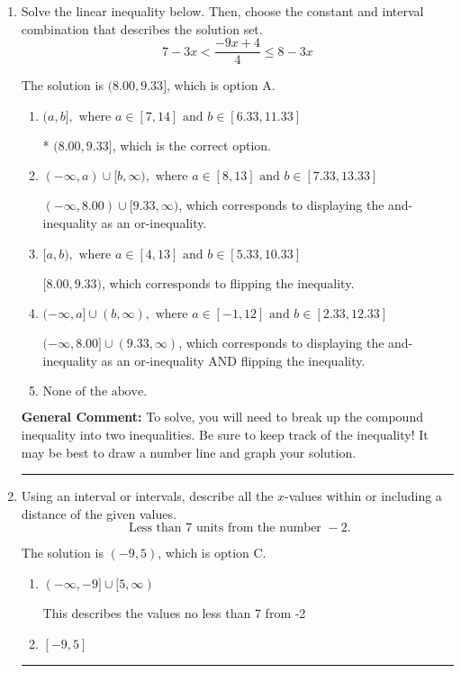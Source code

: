 \documentclass{extbook}[14pt]
\newcommand{\litem}[1]{\item #1

\rule{\textwidth}{0.4pt}}
\begin{document}
\begin{enumerate}
{\begin{enumerate}[label=\Alph*.]
Corresponds to the variable canceling, which does not happen in this instance.
\end{enumerate}

\textbf{General Comment:} When multiplying or dividing by a negative, flip the sign.
}
\litem{
Solve the linear inequality below. Then, choose the constant and interval combination that describes the solution set.
\[ 7 - 3 x < \frac{-9 x + 4}{4} \leq 8 - 3 x \]

The solution is \( (8.00, 9.33] \), which is option A.\begin{enumerate}[label=\Alph*.]
\item \( (a, b], \text{ where } a \in [7, 14] \text{ and } b \in [6.33, 11.33] \)

* $(8.00, 9.33]$, which is the correct option.
\item \( (-\infty, a) \cup [b, \infty), \text{ where } a \in [8, 13] \text{ and } b \in [7.33, 13.33] \)

$(-\infty, 8.00) \cup [9.33, \infty)$, which corresponds to displaying the and-inequality as an or-inequality.
\item \( [a, b), \text{ where } a \in [4, 13] \text{ and } b \in [5.33, 10.33] \)

$[8.00, 9.33)$, which corresponds to flipping the inequality.
\item \( (-\infty, a] \cup (b, \infty), \text{ where } a \in [-1, 12] \text{ and } b \in [2.33, 12.33] \)

$(-\infty, 8.00] \cup (9.33, \infty)$, which corresponds to displaying the and-inequality as an or-inequality AND flipping the inequality.
\item \( \text{None of the above.} \)


\end{enumerate}

\textbf{General Comment:} To solve, you will need to break up the compound inequality into two inequalities. Be sure to keep track of the inequality! It may be best to draw a number line and graph your solution.
}
\litem{
Using an interval or intervals, describe all the $x$-values within or including a distance of the given values.
\[ \text{ Less than } 7 \text{ units from the number } -2. \]

The solution is \( (-9, 5) \), which is option C.\begin{enumerate}[label=\Alph*.]
\item \( (-\infty, -9] \cup [5, \infty) \)

This describes the values no less than 7 from -2
\item \( [-9, 5] \)


\end{enumerate}}
\end{enumerate}
\end{document}
